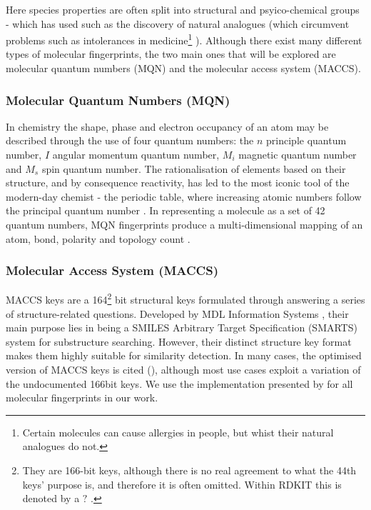 Here species properties are often split into structural and psyico-chemical groups - which has used such as the discovery of natural analogues (which circumvent problems such as intolerances in medicine\footnote{Certain molecules can cause allergies in people, but whist their natural analogues do not. } \citep{analog}). Although there exist many different types of molecular fingerprints, the two main ones that will be explored are molecular quantum numbers (MQN) and the molecular access system (MACCS).

\subsubsection{Molecular Quantum Numbers (MQN)}
In chemistry the shape, phase and electron occupancy of an atom may be described through the use of four quantum numbers: the $n$ principle quantum number, $I$ angular momentum quantum number, $M_i$ magnetic quantum number and $M_s$ spin quantum number. The rationalisation of elements based on their structure, and by consequence reactivity, has led to the most iconic tool of the modern-day chemist - the periodic table, where increasing atomic numbers follow the principal quantum number \citep{periodic}. In representing a molecule as a set of 42 quantum numbers, MQN fingerprints produce a multi-dimensional mapping of an atom, bond, polarity and topology count \citep{MQN}.

\subsubsection{Molecular Access System (MACCS)}
MACCS keys are a 164\footnote{They are 166-bit keys, although there is no real agreement to what the 44th keys' purpose is, and therefore it is often omitted. Within RDKIT this is denoted by a $?$ \citep{rdkitcode}.} bit structural keys formulated through answering a series of structure-related questions. Developed by MDL Information Systems \citep{maccs}, their main purpose lies in being a SMILES Arbitrary Target Specification (SMARTS) system for substructure searching. However, their distinct structure key format makes them highly suitable for similarity detection. In many cases, the optimised version of MACCS keys is cited (\citep{optimised}), although most use cases exploit a variation of the undocumented 166bit keys. We use the implementation presented by \citep{rdkit,rdkitcode} for all molecular fingerprints in our work.


